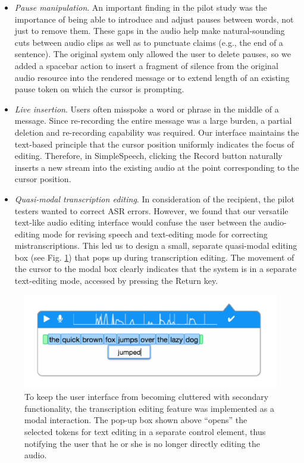 \begin{itemize}
	\item \emph{Pause manipulation}. An important finding in the pilot study was the importance of being able to introduce and adjust pauses between words, not just to remove them.
	These gaps in the audio help make natural-sounding cuts between audio clips as well as to punctuate claims (e.g., the end of a sentence). 
	The original system only allowed the user to delete pauses, so we added a spacebar action to insert a fragment of silence from the original audio resource into the rendered message or to extend length of an existing pause token on which the cursor is prompting.
	\item \emph{Live insertion}. Users often misspoke a word or phrase in the middle of a message.
	Since re-recording the entire message was a large burden, a partial deletion and re-recording capability was required.
	Our interface maintains the text-based principle that the cursor position uniformly indicates the focus of editing.
	Therefore, in SimpleSpeech, clicking the Record button naturally inserts a new stream into the existing audio at the point corresponding to the cursor position.
	\item \emph{Quasi-modal transcription editing}. In consideration of the recipient, the pilot testers wanted to correct ASR errors.
	However, we found that our versatile text-like audio editing interface would confuse the user between the audio-editing mode for revising speech and text-editing mode for correcting mistranscriptions.
	This led us to design a small, separate quasi-modal editing box (see Fig. \ref{fig:transcription}) that pops up during transcription editing.
	The movement of the cursor to the modal box clearly indicates that the system is in a separate text-editing mode, accessed by pressing the Return key.
\end{itemize}



\begin{figure}
	\centering
	\includegraphics[width=\columnwidth,keepaspectratio]{figures/transcription_edit}
	\caption{To keep the user interface from becoming cluttered with secondary functionality, the transcription editing feature was implemented as a modal interaction. The pop-up box shown above ``opens'' the selected tokens for text editing in a separate control element, thus notifying the user that he or she is no longer directly editing the audio.}
	\label{fig:transcription}
\end{figure}


